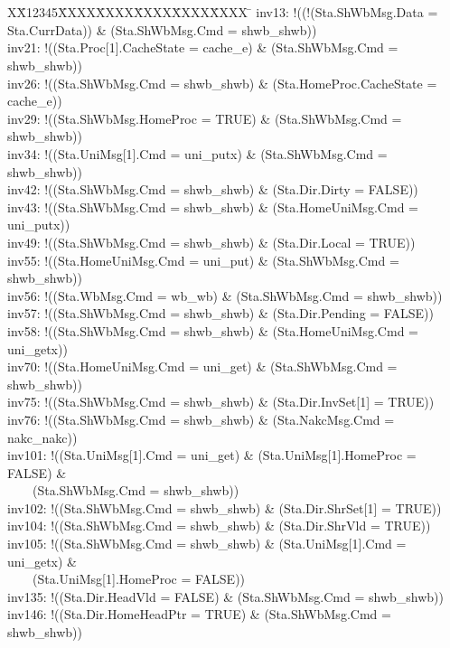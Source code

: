 \documentclass{llncs-new}
\newlength{\fminilength}
\newenvironment{fmini}[1][\linewidth]
  {\setlength{\fminilength}{#1\fboxsep-2\fboxrule}%
   \vspace{2ex}\noindent\begin{lrbox}{\fminibox}\begin{minipage}{\fminilength}%
   \mbox{ }\hfill\vspace{-2.5ex}}%
  {\end{minipage}\end{lrbox}\vspace{1ex}\hspace{0ex}%
   \framebox{\usebox{\fminibox}}}
\newenvironment{specification}
{\noindent\scriptsize
\tt\begin{fmini}\begin{tabbing}X\=X12345\=XXXX\=XXXX\=XXXX\=XXXX\=XXXX
\=\+\kill} {\end{tabbing}\normalfont\end{fmini}}
\begin{document}
\begin{specification}
inv13: !((!(Sta.ShWbMsg.Data = Sta.CurrData)) \& (Sta.ShWbMsg.Cmd = shwb\_shwb))\\
inv21: !((Sta.Proc[1].CacheState = cache\_e) \& (Sta.ShWbMsg.Cmd = shwb\_shwb))\\
inv26: !((Sta.ShWbMsg.Cmd = shwb\_shwb) \& (Sta.HomeProc.CacheState = cache\_e))\\
inv29: !((Sta.ShWbMsg.HomeProc = TRUE) \& (Sta.ShWbMsg.Cmd = shwb\_shwb))\\
inv34: !((Sta.UniMsg[1].Cmd = uni\_putx) \& (Sta.ShWbMsg.Cmd = shwb\_shwb))\\
inv42: !((Sta.ShWbMsg.Cmd = shwb\_shwb) \& (Sta.Dir.Dirty = FALSE))\\
inv43: !((Sta.ShWbMsg.Cmd = shwb\_shwb) \& (Sta.HomeUniMsg.Cmd = uni\_putx))\\
inv49: !((Sta.ShWbMsg.Cmd = shwb\_shwb) \& (Sta.Dir.Local = TRUE))\\
inv55: !((Sta.HomeUniMsg.Cmd = uni\_put) \& (Sta.ShWbMsg.Cmd = shwb\_shwb))\\
inv56: !((Sta.WbMsg.Cmd = wb\_wb) \& (Sta.ShWbMsg.Cmd = shwb\_shwb))\\
inv57: !((Sta.ShWbMsg.Cmd = shwb\_shwb) \& (Sta.Dir.Pending = FALSE))\\
inv58: !((Sta.ShWbMsg.Cmd = shwb\_shwb) \& (Sta.HomeUniMsg.Cmd = uni\_getx))\\
inv70: !((Sta.HomeUniMsg.Cmd = uni\_get) \& (Sta.ShWbMsg.Cmd = shwb\_shwb))\\
inv75: !((Sta.ShWbMsg.Cmd = shwb\_shwb) \& (Sta.Dir.InvSet[1] = TRUE))\\
inv76: !((Sta.ShWbMsg.Cmd = shwb\_shwb) \& (Sta.NakcMsg.Cmd = nakc\_nakc))\\
inv101: !((Sta.UniMsg[1].Cmd = uni\_get) \& (Sta.UniMsg[1].HomeProc = FALSE) \&\\ ~~~~(Sta.ShWbMsg.Cmd = shwb\_shwb))\\
inv102: !((Sta.ShWbMsg.Cmd = shwb\_shwb) \& (Sta.Dir.ShrSet[1] = TRUE))\\
inv104: !((Sta.ShWbMsg.Cmd = shwb\_shwb) \& (Sta.Dir.ShrVld = TRUE))\\
inv105: !((Sta.ShWbMsg.Cmd = shwb\_shwb) \& (Sta.UniMsg[1].Cmd = uni\_getx) \&\\~~~~(Sta.UniMsg[1].HomeProc = FALSE))\\
inv135: !((Sta.Dir.HeadVld = FALSE) \& (Sta.ShWbMsg.Cmd = shwb\_shwb))\\
inv146: !((Sta.Dir.HomeHeadPtr = TRUE) \& (Sta.ShWbMsg.Cmd = shwb\_shwb))
\end{specification}
\end{document}
